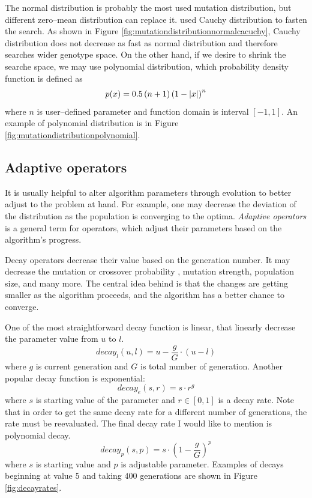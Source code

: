 The normal distribution is probably the most used mutation distribution, but different zero--mean distribution can replace it. \citet*{CauchyDistributionMutation} used Cauchy distribution to fasten the search. As shown in Figure \ref{fig:mutationdistributionnormalcacuchy}, Cauchy distribution does not decrease as fast as normal distribution and therefore searches wider genotype space. On the other hand, if we desire to shrink the searche space, we may use polynomial distribution, which probability density function is defined as
$$
p(x)=0.5 \left(n + 1\right)\left( 1 - \left|{x}\right| \right)^n
$$ 
where $n$ is user--defined parameter and function domain is interval $\left[-1,1\right]$. An example of polynomial distribution is in Figure \ref{fig:mutationdistributionpolynomial}.

\subsection{Adaptive operators}
\label{chap:adaptiveoperators}

It is usually helpful to alter algorithm parameters through evolution to better adjust to the problem at hand. For example, one may decrease the deviation of the distribution as the population is converging to the optima. \emph{Adaptive operators} is a general term for operators, which adjust their parameters based on the algorithm's progress.

Decay operators decrease their value based on the generation number. It may decrease the mutation or crossover probability \citep{DecayGA}, mutation strength, population size, and many more. The central idea behind is that the changes are getting smaller as the algorithm proceeds, and the algorithm has a better chance to converge.

One of the most straightforward decay function is linear, that linearly decrease the parameter value from $u$ to $l$.
$$
decay_l(u,l) = u - \frac{g}{G}\cdot\left( u - l \right)
$$
where $g$ is current generation and $G$ is total number of generation. Another popular decay function is exponential:
$$
decay_e(s,r) = s\cdot r^g
$$
where $s$ is starting value of the parameter and $r\in\left[0,1\right]$ is a decay rate. Note that in order to get the same decay rate for a different number of generations, the rate must be reevaluated.
The final decay rate I would like to mention is polynomial decay.
$$
decay_p(s,p) = s \cdot\left(1 - \frac{g}{G}\right)^p
$$
where $s$ is starting value and $p$ is adjustable parameter. Examples of decays beginning at value $5$ and taking $400$ generations are shown in Figure \ref{fig:decayrates}.

